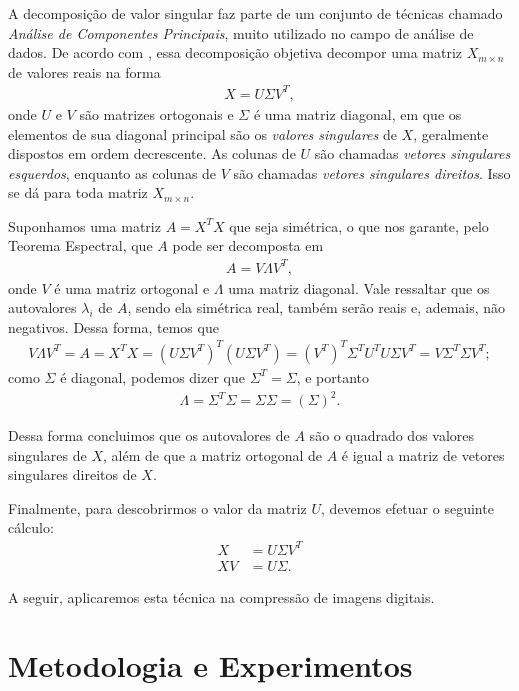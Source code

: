 \documentclass[a4paper,12pt]{article}
\begin{document}
A decomposição de valor singular faz parte de um conjunto de técnicas chamado \emph{Análise de Componentes Principais}, muito utilizado no campo de análise de dados. De acordo com \cite{dearaujo2014}, essa decomposição objetiva decompor uma matriz $X_{m \times n}$ de valores reais na forma
\begin{align}  
X = U \Sigma V^{T} \label{svd},
\end{align}
onde $U$ e $V$ são matrizes ortogonais e $\Sigma$ é uma matriz diagonal, em que os elementos de sua diagonal principal são os \emph{valores singulares} de $X$, geralmente dispostos em ordem decrescente. As colunas de $U$ são chamadas \emph{vetores singulares esquerdos}, enquanto as colunas de $V$ são chamadas \emph{vetores singulares direitos}. Isso se dá para toda matriz $X_{m \times n}$.

Suponhamos uma matriz $A = X^{T}X$ que seja simétrica, o que nos garante, pelo Teorema Espectral, que $A$ pode ser decomposta em
\begin{align*}
A = V \Lambda V^{T},
\end{align*}
onde $V$ é uma matriz ortogonal e $\Lambda$ uma matriz diagonal. Vale ressaltar que os autovalores $\lambda_{i}$ de $A$, sendo ela simétrica real, também serão reais e, ademais, não negativos. Dessa forma, temos que
\begin{align*}
V \Lambda V^{T} = A = X^{T}X = (U \Sigma V^{T})^{T}(U \Sigma V^{T}) = (V^{T})^{T} \Sigma^{T} U^{T} U \Sigma V^{T} = V \Sigma^{T} \Sigma V^{T};
\end{align*}
como $\Sigma$ é diagonal, podemos dizer que $\Sigma^{T} = \Sigma$, e portanto
\begin{align*}
\Lambda = \Sigma^{T} \Sigma = \Sigma \Sigma = (\Sigma)^{2}.   
\end{align*}

Dessa forma concluimos que os autovalores de $A$ são o quadrado dos valores singulares de $X$, além de que a matriz ortogonal de $A$ é igual a matriz de vetores singulares direitos de $X$.

Finalmente, para descobrirmos o valor da matriz $U$, devemos efetuar o seguinte cálculo:
\begin{align*}
X &= U \Sigma V^{T}\\
XV &= U \Sigma.
\end{align*}

A seguir, aplicaremos esta técnica na compressão de imagens digitais.
\section{Metodologia e Experimentos}
\label{sec:metodologia}
\end{document}
